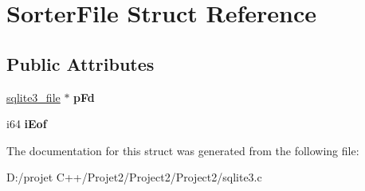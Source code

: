 \hypertarget{struct_sorter_file}{}\section{Sorter\+File Struct Reference}
\label{struct_sorter_file}
\subsection*{Public Attributes}
\begin{DoxyCompactItemize}
\item 
\mbox{\label{struct_sorter_file_afa23123282380b8d04b943479cabadef}} 
\mbox{\hyperlink{structsqlite3__file}{sqlite3\+\_\+file}} $\ast$ {\bfseries p\+Fd}
\item 
\mbox{\label{struct_sorter_file_a5c5f37fc8b5c432d8bf30eb6e40f7823}} 
i64 {\bfseries i\+Eof}
\end{DoxyCompactItemize}


The documentation for this struct was generated from the following file\+:\begin{DoxyCompactItemize}
\item 
D\+:/projet C++/\+Projet2/\+Project2/\+Project2/sqlite3.\+c\end{DoxyCompactItemize}
